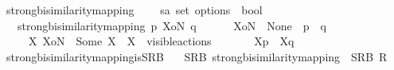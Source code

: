 \begin{isabellebody}
\endisatagproof
{\isafoldproof}%
%
\isadelimproof
%
\endisadelimproof
%
\isadelimdocument
%
\endisadelimdocument
%
\isatagdocument
%
\isamarkuptrue%
%
\endisatagdocument
{\isafolddocument}%
%
\isadelimdocument
%
\endisadelimdocument
{}\isamarkupfalse%
\ strong{\isacharunderscore}{\kern0pt}bisimilarity{\isacharunderscore}{\kern0pt}mapping\ %
\isanewline
\ \ {\isacharcolon}{\kern0pt}{\isacharcolon}{\kern0pt}\ {\isacartoucheopen}{\isacharprime}{\kern0pt}s{\isasymRightarrow}{\isacharprime}{\kern0pt}a\ set\ option{\isasymRightarrow}{\isacharprime}{\kern0pt}s\ {\isasymRightarrow}\ bool{\isacartoucheclose}\isanewline
\ \ \ {\isacartoucheopen}{\isacharparenleft}{\kern0pt}strong{\isacharunderscore}{\kern0pt}bisimilarity{\isacharunderscore}{\kern0pt}mapping{\isacharparenright}{\kern0pt}\ p\ XoN\ q\ \isanewline
\ \ \ \ {\isasymequiv}\ {\isacharparenleft}{\kern0pt}XoN\ {\isacharequal}{\kern0pt}\ None\ {\isasymand}\ {\isacharparenleft}{\kern0pt}{\isasymtheta}{\isacharparenleft}{\kern0pt}p{\isacharparenright}{\kern0pt}{\isacharparenright}{\kern0pt}\ {\isasymleftrightarrow}\ {\isacharparenleft}{\kern0pt}{\isasymtheta}{\isacharparenleft}{\kern0pt}q{\isacharparenright}{\kern0pt}{\isacharparenright}{\kern0pt}{\isacharparenright}{\kern0pt}\ {\isasymor}\isanewline
\ \ \ \ {\isacharparenleft}{\kern0pt}{\isasymexists}\ X{\isachardot}{\kern0pt}\ XoN\ {\isacharequal}{\kern0pt}\ Some\ X\ {\isasymand}\ X\ {\isasymsubseteq}\ visible{\isacharunderscore}{\kern0pt}actions\ {\isasymand}\ \isanewline
\ \ \ \ \ {\isasymtheta}{\isacharbrackleft}{\kern0pt}X{\isacharbrackright}{\kern0pt}{\isacharparenleft}{\kern0pt}p{\isacharparenright}{\kern0pt}\ {\isasymleftrightarrow}\ {\isasymtheta}{\isacharbrackleft}{\kern0pt}X{\isacharbrackright}{\kern0pt}{\isacharparenleft}{\kern0pt}q{\isacharparenright}{\kern0pt}{\isacharparenright}{\kern0pt}{\isacartoucheclose}\isanewline
\isanewline
{}\isamarkupfalse%
\ strong{\isacharunderscore}{\kern0pt}bisimilarity{\isacharunderscore}{\kern0pt}mapping{\isacharunderscore}{\kern0pt}is{\isacharunderscore}{\kern0pt}SRB{\isacharcolon}{\kern0pt}\isanewline
\ \ \ {\isacartoucheopen}SRB\ strong{\isacharunderscore}{\kern0pt}bisimilarity{\isacharunderscore}{\kern0pt}mapping{\isacartoucheclose}\ {\isacharparenleft}{\kern0pt}\ {\isacartoucheopen}SRB\ {\isacharquery}{\kern0pt}R{\isacartoucheclose}{\isacharparenright}{\kern0pt}\isanewline
%
\isadelimproof
\ \ %
\endisadelimproof
%
\isatagproof

\end{isabellebody}
